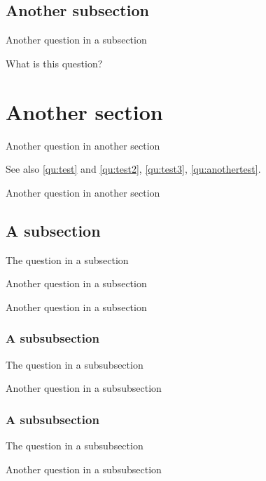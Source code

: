 \documentclass{scrartcl}
\begin{document}
\subsection{Another subsection}

\begin{question}
Another question in a subsection
\end{question}

\begin{question}
What is this question?
\end{question}

\section{Another section}

\begin{question}\label{qu:anothertest}
Another question in another section
\end{question}

See also \ref{qu:test} and \ref{qu:test2}, \ref{qu:test3}, \ref{qu:anothertest}.

\begin{question}
Another question in another section
\end{question}

\subsection{A subsection}

\begin{question}
The question in a subsection
\end{question}

\begin{question}
Another question in a subsection
\end{question}

\begin{question}
Another question in a subsection
\end{question}

\subsubsection{A subsubsection}

\begin{question}
The question in a subsubsection
\end{question}

\begin{question}
Another question in a subsubsection
\end{question}

\subsubsection{A subsubsection}

\begin{question}
The question in a subsubsection
\end{question}

\begin{question}
Another question in a subsubsection
\end{question}
\end{document}
